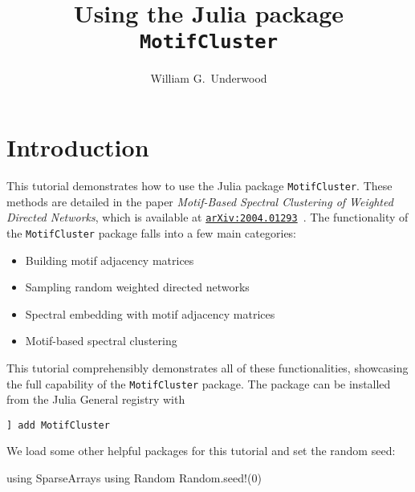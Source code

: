 \documentclass{article}
\title{Using the Julia package \texttt{MotifCluster}}
\author{William G.\ Underwood}
\begin{document}
\maketitle
\tableofcontents

\pagebreak

\section{Introduction}

This tutorial demonstrates how to use the Julia package \texttt{MotifCluster}.
These methods are detailed in the paper
\textit{Motif-Based Spectral Clustering of Weighted Directed Networks},
which is available at
\href{https://arxiv.org/abs/2004.01293}{\texttt{arXiv:2004.01293}}~\cite{UnderwoodElliottCucuringu_2020_Motifs}.
The functionality of the \texttt{MotifCluster} package falls into a few main
categories:

\begin{itemize}
\item Building motif adjacency matrices
\item Sampling random weighted directed networks
\item Spectral embedding with motif adjacency matrices
\item Motif-based spectral clustering
\end{itemize}

This tutorial comprehensibly demonstrates all of these functionalities,
showcasing the full capability of the \texttt{MotifCluster} package.
The package can be installed from the Julia General registry with

\begin{tcolorbox}[colback=black!5!white,colframe=black!15!white]
\texttt{] add MotifCluster}
\end{tcolorbox}

We load some other helpful packages for this tutorial and set the random seed:

\begin{tcolorbox}[colback=black!5!white,colframe=black!15!white]
\begin{juliablock}
using SparseArrays
using Random
Random.seed!(0)
\end{juliablock}
\end{tcolorbox}


\end{document}

